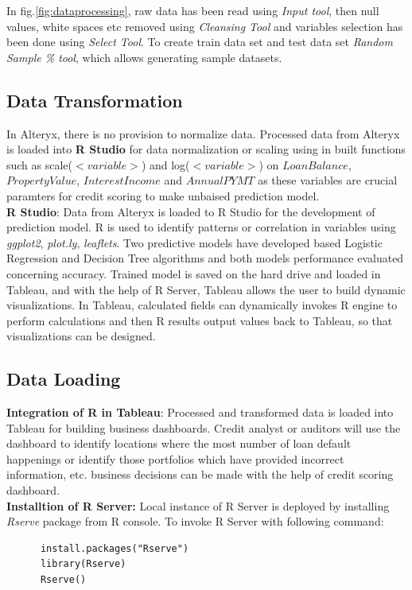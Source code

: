 In fig.\ref{fig:dataprocessing}, raw data has been read using \emph{Input tool}, then null values, white spaces etc removed using \emph{Cleansing Tool} and variables selection has been done using \emph{Select Tool}. To create train data set and test data set \emph{Random Sample \% tool}, which allows generating sample datasets.\\

\subsection{Data Transformation}
In Alteryx, there is no provision to normalize data. Processed data from Alteryx is loaded into \textbf{R Studio} for data normalization or scaling using in built functions such as scale($<variable>$) and log($<variable>$) on $LoanBalance$, $PropertyValue$, $InterestIncome$ and $AnnualPYMT$ as these variables are crucial paramters for credit scoring to make unbaised prediction model.\\

\textbf{R Studio}: Data from Alteryx is loaded to R Studio for the development of prediction model. R is used to identify patterns or correlation in variables using \emph{ggplot2}, \emph{plot.ly}, \emph{leaflets}. Two predictive models have developed based Logistic Regression and Decision Tree algorithms and both models performance evaluated concerning accuracy. Trained model is saved on the hard drive and loaded in Tableau, and with the help of R Server, Tableau allows the user to build dynamic visualizations. In Tableau, calculated fields can dynamically invokes R engine to perform calculations and then R results output values back to Tableau, so that visualizations can be designed.\\


\subsection{Data Loading}\label{tableau}
\textbf{Integration of R in Tableau}: Processed and transformed data is loaded into Tableau for building business dashboards. Credit analyst or auditors will use the dashboard to identify locations where the most number of loan default happenings or identify those portfolios which have provided incorrect information, etc. business decisions can be made with the help of credit scoring dashboard.\\

\textbf{Installtion of R Server:} Local instance of R Server is deployed by installing \emph{Rserve} package from R console. To invoke R Server with following command:
      \begin{verbatim}
      install.packages("Rserve")
      library(Rserve)
      Rserve()
      \end{verbatim}

